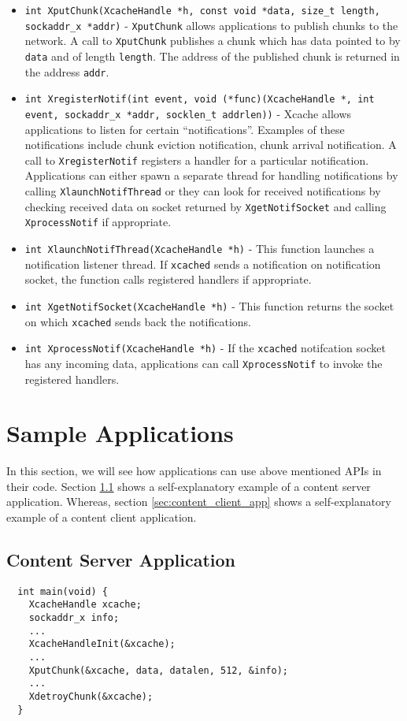\begin{itemize}
\item{\texttt{int XputChunk(XcacheHandle *h, const void *data, size\_t
  length, sockaddr\_x *addr)}} - \texttt{XputChunk} allows
  applications to publish chunks to the network. A call to
  \texttt{XputChunk} publishes a chunk which has data pointed to by
  \texttt{data} and of length \texttt{length}. The address of the
  published chunk is returned in the address \texttt{addr}.
\item{\texttt{int XregisterNotif(int event, void (*func)(XcacheHandle
    *, int event, sockaddr\_x *addr, socklen\_t addrlen))}} - Xcache
  allows applications to listen for certain
  ``notifications''. Examples of these notifications include chunk
  eviction notification, chunk arrival notification. A call to
  \texttt{XregisterNotif} registers a handler for a particular
  notification. Applications can either spawn a separate thread for
  handling notifications by calling \texttt{XlaunchNotifThread} or
  they can look for received notifications by checking received data
  on socket returned by \texttt{XgetNotifSocket} and calling
  \texttt{XprocessNotif} if appropriate.
\item{\texttt{int XlaunchNotifThread(XcacheHandle *h)}} - This
  function launches a notification listener thread. If
  \texttt{xcached} sends a notification on notification socket, the
  function calls registered handlers if appropriate.
\item{\texttt{int XgetNotifSocket(XcacheHandle *h)}} - This function
  returns the socket on which \texttt{xcached} sends back the
  notifications.
\item{\texttt{int XprocessNotif(XcacheHandle *h)}} - If the
  \texttt{xcached} notifcation socket has any incoming data,
  applications can call \texttt{XprocessNotif} to invoke the
  registered handlers.
\end{itemize}

\section{Sample Applications}
In this section, we will see how applications can use above mentioned
APIs in their code. Section \ref{sec:content_server_app} shows a
self-explanatory example of a content server application. Whereas,
section \ref{sec:content_client_app} shows a self-explanatory example
of a content client application.

\subsection{Content Server Application}
\label{sec:content_server_app}
      {
\begin{verbatim}
  int main(void) {
    XcacheHandle xcache;
    sockaddr_x info;
    ...
    XcacheHandleInit(&xcache);
    ...
    XputChunk(&xcache, data, datalen, 512, &info);
    ...
    XdetroyChunk(&xcache);
  }
\end{verbatim}
      }


